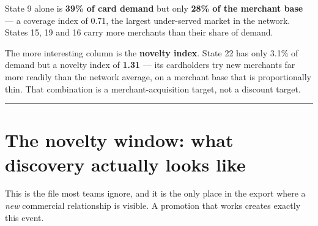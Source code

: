 \documentclass[
]{article}
\begin{document}
State 9 alone is \textbf{39\% of card demand} but only \textbf{28\% of
the merchant base} --- a coverage index of 0.71, the largest
under-served market in the network. States 15, 19 and 16 carry more
merchants than their share of demand.

The more interesting column is the \textbf{novelty index}. State 22 has
only 3.1\% of demand but a novelty index of \textbf{1.31} --- its
cardholders try new merchants far more readily than the network average,
on a merchant base that is proportionally thin. That combination is a
merchant-acquisition target, not a discount target.

\begin{center}\rule{0.5\linewidth}{0.5pt}\end{center}

\section{The novelty window: what discovery actually looks
like}\label{the-novelty-window-what-discovery-actually-looks-like}

This is the file most teams ignore, and it is the only place in the
export where a \emph{new} commercial relationship is visible. A
promotion that works creates exactly this event.
\end{document}

